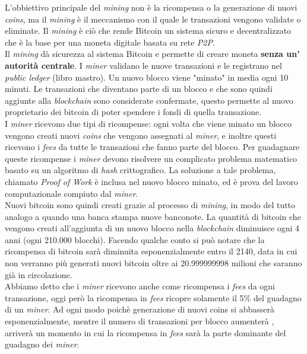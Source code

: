 L'obbiettivo principale del \textit{mining} non \`e la ricompensa o la generazione di nuovi \textit{coins}, ma il \textit{mining} \`e il meccanismo con il quale le transazioni vengono validate o
eliminate. Il \textit{mining} \`e ci\`o che rende Bitcoin un sistema sicuro e decentralizzato che \`e la base per una moneta digitale basata su rete \textit{P2P}.\\
Il \textit{mining} d\`a sicurezza al sistema Bitcoin e permette di creare moneta \textbf{senza un' autorit\`a centrale}. I \textit{miner} validano le nuove transazioni e le registrano nel \textit{public ledger} (libro mastro). Un nuovo blocco viene "minato" in media ogni 10 minuti. Le transazioni che diventano parte di un blocco e che sono quindi aggiunte alla \textit{blockchain} sono considerate confermate, questo permette al nuovo proprietario dei bitcoin di poter spendere i fondi di quella transazione.\\
I \textit{miner} ricevono due tipi di ricompense: ogni volta che viene minato un blocco vengono creati nuovi \textit{coins} che vengono assegnati al \textit{miner}, e inoltre questi ricevono i \textit{fees} da tutte le transazioni che fanno parte del blocco. Per guadagnare queste ricompense i \textit{miner} devono risolvere un complicato problema matematico basato su un algoritmo di \textit{hash} crittografico. La soluzione a tale problema, chiamato \textit{Proof of Work} \`e inclusa nel nuovo blocco minato, ed \`e prova del lavoro computazionale compiuto dal \textit{miner}.\\
Nuovi bitcoin sono quindi creati grazie al processo di \textit{mining}, in modo del tutto analogo a quando una banca stampa nuove banconote. La quantit\`a di bitcoin che vengono creati all'aggiunta di un nuovo blocco nella \textit{blockchain} diminuisce ogni 4 anni (ogni 210.000 blocchi). Facendo qualche conto si pu\`o notare che la ricompensa di bitcoin sar\`a diminuita esponenzialmente entro il 2140, data in cui non verranno pi\`u generati nuovi bitcoin oltre ai 20.999999998 milioni che saranno gi\`a in circolazione.\\
Abbiamo detto che i \textit{miner} ricevono anche come ricompensa i \textit{fees} da ogni transazione, oggi per\`o la ricompensa in \textit{fees} ricopre solamente il 5\% del guadagno di un \textit{miner}. Ad ogni modo poich\`e generazione di nuovi coins si abbasser\`a esponenzialmente, mentre il numero di transazioni per blocco aumenter\`a , arriver\`a un momento in cui la ricompensa in \textit{fees} sar\`a la parte dominante del guadagno dei  \textit{miner}.




